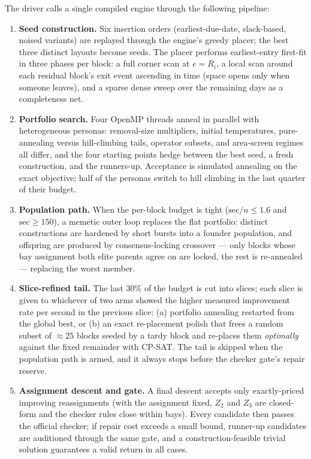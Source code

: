 \documentclass[runningheads]{llncs}
\begin{document}
The driver calls a single compiled engine through the following pipeline:
\begin{enumerate}
\item \textbf{Seed construction.} Six insertion orders (earliest-due-date,
slack-based, noised variants) are replayed through the engine's greedy placer;
the best three distinct layouts become seeds. The placer performs
earliest-entry first-fit in three phases per block: a full corner scan at
$e = R_i$, a local scan around each residual block's exit event ascending in
time (space opens only when someone leaves), and a sparse dense sweep over the
remaining days as a completeness net.
\item \textbf{Portfolio search.} Four OpenMP threads anneal in parallel with
heterogeneous personas: removal-size multipliers, initial temperatures,
pure-annealing versus hill-climbing tails, operator subsets, and area-screen
regimes all differ, and the four starting points hedge between the best seed,
a fresh construction, and the runners-up. Acceptance is simulated annealing on
the exact objective; half of the personas switch to hill climbing in the last
quarter of their budget.
\item \textbf{Population path.} When the per-block budget is tight
($\mathrm{sec}/n \le 1.6$ and $\mathrm{sec} \ge 150$), a memetic outer loop
replaces the flat portfolio: distinct constructions are hardened by short
bursts into a founder population, and offspring are produced by
consensus-locking crossover --- only blocks whose bay assignment both elite
parents agree on are locked, the rest is re-annealed --- replacing the worst
member.
\item \textbf{Slice-refined tail.} The last 30\% of the budget is cut into
slices; each slice is given to whichever of two arms showed the higher
measured improvement rate per second in the previous slice: (a) portfolio
annealing restarted from the global best, or (b) an exact re-placement polish
that frees a random subset of $\approx 25$ blocks seeded by a tardy block and
re-places them \emph{optimally} against the fixed remainder with CP-SAT. The
tail is skipped when the population path is armed, and it always stops before
the checker gate's repair reserve.
\item \textbf{Assignment descent and gate.} A final descent accepts only
exactly-priced improving reassignments (with the assignment fixed, $Z_2$ and
$Z_3$ are closed-form and the checker rules close within bays). Every
candidate then passes the official checker; if repair cost exceeds a small
bound, runner-up candidates are auditioned through the same gate, and a
construction-feasible trivial solution guarantees a valid return in all
cases.
\end{enumerate}
\end{document}

